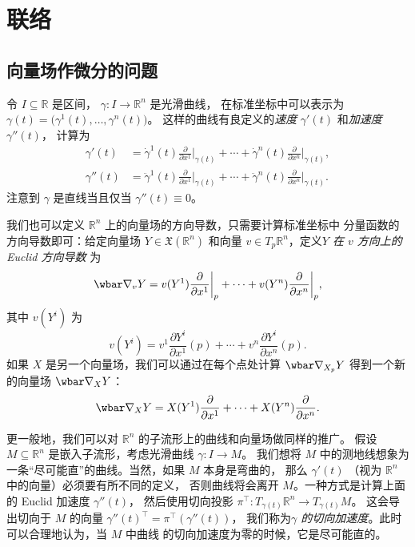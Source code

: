 


\chapter{联络}

\section{向量场作微分的问题}

令 $I\subseteq \mathbb{R}$ 是区间， $\gamma:I\to \mathbb{R}^n$ 是光滑曲线，
在标准坐标中可以表示为 $\gamma(t)=\bigl(\gamma^1(t),\dots,\gamma^n(t)\bigr)$。
这样的曲线有良定义的\emph{速度} $\gamma'(t)$ 和\emph{加速度} $\gamma''(t)$，
计算为
\begin{align}\label{eq:velocity of curve in Euclid space}
  \gamma'(t)&=\dot{\gamma}^1(t)\frac{\partial}{\partial x^1}\bigg|_{\gamma(t)}
  +\cdots+\dot\gamma^n(t)\frac{\partial}{\partial x^n}\bigg|_{\gamma(t)},\\
  \gamma''(t)&=\ddot{\gamma}^1(t)\frac{\partial}{\partial x^1}\bigg|_{\gamma(t)}
  +\cdots+\ddot\gamma^n(t)\frac{\partial}{\partial x^n}\bigg|_{\gamma(t)}.
\end{align}
注意到 $\gamma$ 是直线当且仅当 $\gamma''(t)\equiv 0$。

我们也可以定义 $\mathbb{R}^n$ 上的向量场的方向导数，只需要计算标准坐标中
分量函数的方向导数即可：给定向量场 $Y\in \mathfrak{X}(\mathbb{R}^n)$
和向量 $v\in T_p \mathbb{R}^n$，定义\emph{$Y$ 在 $v$ 方向上的 Euclid 方向导数}
为
\begin{equation}\label{eq:euclid directional derivative}
  \wbar\nabla_v Y=v(Y^1)\frac{\partial}{\partial x^1}\bigg|_p
  + \cdots + v(Y^n)\frac{\partial}{\partial x^n}\bigg|_p,
\end{equation}
其中 $v(Y^i)$ 为
\[
  v(Y^i)=v^1\frac{\partial Y^i}{\partial x^1}(p)+\cdots +
  v^n\frac{\partial Y^i}{\partial x^n}(p).
\]
如果 $X$ 是另一个向量场，我们可以通过在每个点处计算 $\wbar\nabla_{X_p}Y$
得到一个新的向量场 $\wbar\nabla_XY$：
\begin{equation}\label{eq:euclid connection}
  \wbar\nabla_XY=X(Y^1)  \frac{\partial}{\partial x^1}+\cdots+
  X(Y^n)  \frac{\partial}{\partial x^n}.
\end{equation}

更一般地，我们可以对 $\mathbb{R}^n$ 的子流形上的曲线和向量场做同样的推广。
假设 $M\subseteq \mathbb{R}^n$ 是嵌入子流形，考虑光滑曲线 $\gamma:I\to M$。
我们想将 $M$ 中的测地线想象为一条“尽可能直”的曲线。当然，如果 $M$ 本身是弯曲的，
那么 $\gamma'(t)$ （视为 $\mathbb{R}^n$ 中的向量）必须要有所不同的定义，
否则曲线将会离开 $M$。一种方式是计算上面的 Euclid 加速度 $\gamma''(t)$，
然后使用切向投影 $\pi^\top:T_{\gamma(t)}\mathbb{R}^n\to T_{\gamma(t)}M$。
这会导出切向于 $M$ 的向量 $\gamma''(t)^\top=\pi^\top(\gamma''(t))$，
我们称为\emph{$\gamma$ 的切向加速度}。此时可以合理地认为，当 $M$ 中曲线
的切向加速度为零的时候，它是尽可能直的。

